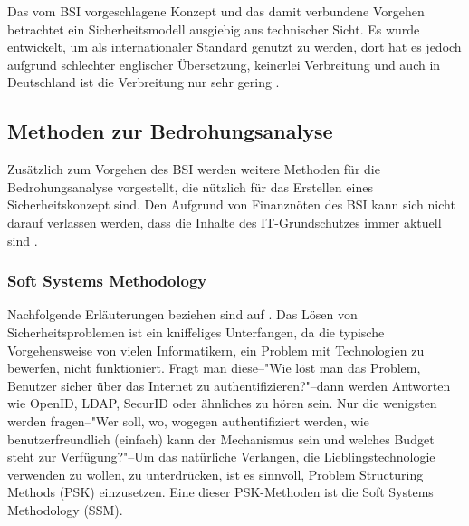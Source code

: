\documentclass[11pt,a4paper]{report}
\begin{document}
Das vom BSI vorgeschlagene Konzept und das damit verbundene Vorgehen betrachtet ein Sicherheitsmodell ausgiebig aus technischer Sicht. Es wurde entwickelt, um als internationaler Standard genutzt zu werden, dort hat es jedoch aufgrund schlechter englischer Übersetzung, keinerlei Verbreitung und auch in Deutschland ist die Verbreitung nur sehr gering \cite{bsi_kritik}. 

\subsection{Methoden zur Bedrohungsanalyse}

Zusätzlich zum Vorgehen des BSI werden weitere Methoden für die Bedrohungsanalyse vorgestellt, die nützlich für das Erstellen eines Sicherheitskonzept sind. Den Aufgrund von Finanznöten des BSI kann sich nicht darauf verlassen werden, dass die Inhalte des IT-Grund\-schutzes immer aktuell sind \cite{bsi_not}.

\subsubsection{Soft Systems Methodology} \label{sec:ssm}

Nachfolgende Erläuterungen beziehen sind auf \cite[s.~252]{gutmann}. 
Das Lösen von Sicherheitsproblemen ist ein kniffeliges Unterfangen, da die typische Vorgehensweise von vielen Informatikern, ein Problem mit Technologien zu bewerfen, nicht funktioniert. Fragt man diese--"Wie löst man das Problem, Benutzer sicher über das Internet zu authentifizieren?"--dann werden Antworten wie OpenID, LDAP, SecurID oder ähnliches zu hören sein. Nur die wenigsten werden fragen--"Wer soll, wo, wogegen authentifiziert werden, wie benutzerfreundlich (einfach) kann der Mechanismus sein und welches Budget steht zur Verfügung?"--Um das natürliche Verlangen, die Lieblingstechnologie verwenden zu wollen, zu unterdrücken, ist es sinnvoll, Problem Structuring Methods (PSK) einzusetzen. Eine dieser PSK-Methoden ist die Soft Systems Methodology (SSM).
\end{document}
